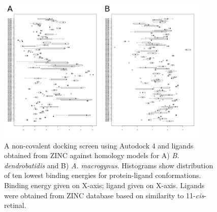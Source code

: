 \begin{figure}[hb]
  \centering
  \includegraphics[width=4in]{./Chapter_RhodStruct/img/BdAm_ZincPlot.png}
  \caption[Docking screen for \textit{Bd} and \textit{Am} models]{A non-covalent docking screen using Autodock 4 and ligands obtained from ZINC against homology models for A) \textit{B. dendrobatidis} and B) \textit{A. macrogynus}. Histograms show distribution of ten lowest binding energies for protein-ligand conformations. Binding energy given on X-axis; ligand given on X-axis. Ligands were obtained from ZINC database based on similarity to 11-\textit{cis}-retinal.}
  \label{fig:ChRhodS_NonCovDock}
\end{figure}

